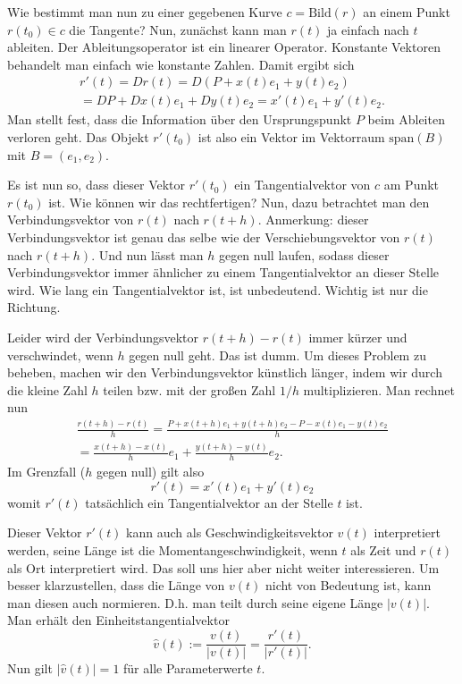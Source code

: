 \documentclass[a4paper,12pt,fleqn]{article}
\begin{document}
Wie bestimmt man nun zu einer gegebenen Kurve \(c=\mathrm{Bild}(r)\)
an einem Punkt \(r(t_0)\in c\) die Tangente? Nun, zunächst kann man
\(r(t)\) ja einfach nach \(t\) ableiten. Der Ableitungsoperator
ist ein linearer Operator. Konstante Vektoren behandelt man einfach
wie konstante Zahlen. Damit ergibt sich
\begin{gather*}
r'(t) = Dr(t) = D(P+x(t)e_1+y(t)e_2)\\
= DP+Dx(t)e_1+Dy(t)e_2 = x'(t)e_1+y'(t)e_2.
\end{gather*}
Man stellt fest, dass die Information über den Ursprungspunkt \(P\)
beim Ableiten verloren geht. Das Objekt \(r'(t_0)\) ist also ein
Vektor im Vektorraum \(\mathrm{span}(B)\) mit \(B=(e_1,e_2)\).

Es ist nun so, dass dieser Vektor \(r'(t_0)\) ein Tangentialvektor
von \(c\) am Punkt \(r(t_0)\) ist. Wie können wir das rechtfertigen?
Nun, dazu betrachtet man den Verbindungsvektor von \(r(t)\) nach
\(r(t+h)\). Anmerkung: dieser Verbindungsvektor ist genau das selbe
wie der Verschiebungsvektor von \(r(t)\) nach \(r(t+h)\).
Und nun lässt man \(h\) gegen null laufen, sodass dieser
Verbindungsvektor immer ähnlicher zu einem Tangentialvektor an dieser
Stelle wird. Wie lang ein Tangentialvektor ist, ist unbedeutend.
Wichtig ist nur die Richtung.

Leider wird der Verbindungsvektor \(r(t+h)-r(t)\) immer kürzer
und verschwindet, wenn \(h\) gegen null geht. Das ist dumm. Um dieses
Problem zu beheben, machen wir den Verbindungsvektor künstlich länger,
indem wir durch die kleine Zahl \(h\) teilen bzw. mit der großen
Zahl \(1/h\) multiplizieren. Man rechnet nun
\begin{gather*}
\frac{r(t+h)-r(t)}{h}
= \frac{P+x(t+h)e_1+y(t+h)e_2-P-x(t)e_1-y(t)e_2}{h}\\
= \frac{x(t+h)-x(t)}{h}e_1 + \frac{y(t+h)-y(t)}{h}e_2.
\end{gather*}
Im Grenzfall (\(h\) gegen null) gilt also
\[r'(t) = x'(t)e_1+y'(t)e_2\]
womit \(r'(t)\) tatsächlich ein Tangentialvektor an der Stelle \(t\)
ist.

Dieser Vektor \(r'(t)\) kann auch als Geschwindigkeitsvektor \(v(t)\)
interpretiert werden, seine Länge ist die Momentangeschwindigkeit,
wenn \(t\) als Zeit und \(r(t)\) als Ort interpretiert wird.
Das soll uns hier aber nicht weiter interessieren.
Um besser klarzustellen, dass die Länge von \(v(t)\)
nicht von Bedeutung ist, kann man diesen auch normieren.
D.h. man teilt durch seine eigene Länge \(|v(t)|\).
Man erhält den Einheitstangentialvektor
\begin{equation}
\hat v(t) := \frac{v(t)}{|v(t)|} = \frac{r'(t)}{|r'(t)|}.
\end{equation}
Nun gilt \(|\hat v(t)|=1\) für alle Parameterwerte \(t\).
\end{document}
